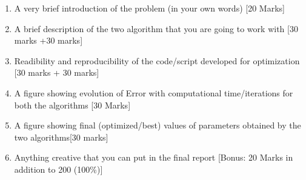 \documentclass[
]{article}
\providecommand{\tightlist}{%
  \setlength{\itemsep}{0pt}\setlength{\parskip}{0pt}}
\begin{document}
\begin{enumerate}
\def\labelenumi{\arabic{enumi}.}
\tightlist
\item
  A very brief introduction of the problem (in your own words) {[}20
  Marks{]}
\item
  A brief description of the two algorithm that you are going to work
  with {[}30 marks +30 marks{]}
\item
  Readibility and reproducibility of the code/script developed for
  optimization {[}30 marks + 30 marks{]}
\item
  A figure showing evolution of Error with computational time/iterations
  for both the algorithms {[}30 Marks{]}
\item
  A figure showing final (optimized/best) values of parameters obtained
  by the two algorithms{[}30 marks{]}
\item
  Anything creative that you can put in the final report {[}Bonus: 20
  Marks in addition to 200 (100\%){]}
\end{enumerate}
\end{document}
